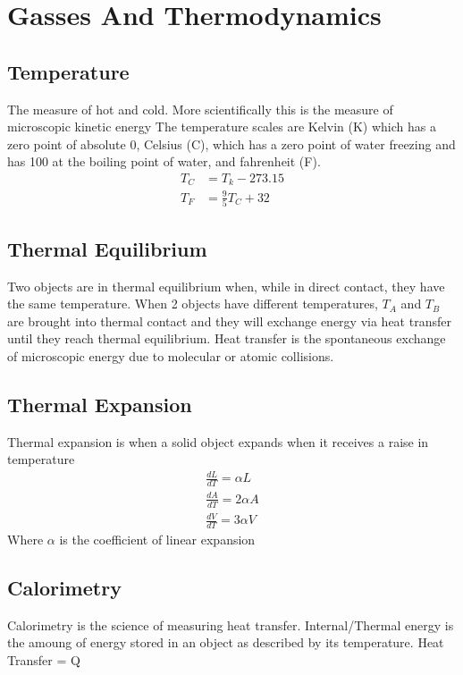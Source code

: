\section{Gasses And Thermodynamics}
	\subsection{Temperature}
	The measure of hot and cold. More scientifically this is the measure of microscopic kinetic energy
	\newline
	The temperature scales are Kelvin (K) which has a zero point of absolute 0, Celsius (C), which has a zero point of water freezing and has 100 at the boiling point of water, and fahrenheit (F).
	\newline
	\begin{align*}
	T_C &= T_k - 273.15\\
	T_F &= \frac{9}{5}T_C+32
	\end{align*}
	\subsection{Thermal Equilibrium}
	Two objects are in thermal equilibrium when, while in direct contact, they have the same temperature. When 2 objects have different temperatures, $T_A$ and $T_B$ are brought into thermal contact and they will exchange energy via heat transfer until they reach thermal equilibrium.
	\newline
	\newline
	Heat transfer is the spontaneous exchange of microscopic energy due to molecular or atomic collisions.
	\subsection{Thermal Expansion}
	Thermal expansion is when a solid object expands when it receives a raise in temperature
	\begin{align*}
	\frac{dL}{dT} = \alpha L\\
	\frac{dA}{dT} = 2\alpha A\\
	\frac{dV}{dT} = 3\alpha V
	\end{align*}
	Where $\alpha$ is the coefficient of linear expansion
	\subsection{Calorimetry}
	Calorimetry is the science of measuring heat transfer. Internal/Thermal energy is the amoung of energy stored in an object as described by its temperature.
	Heat Transfer = Q
